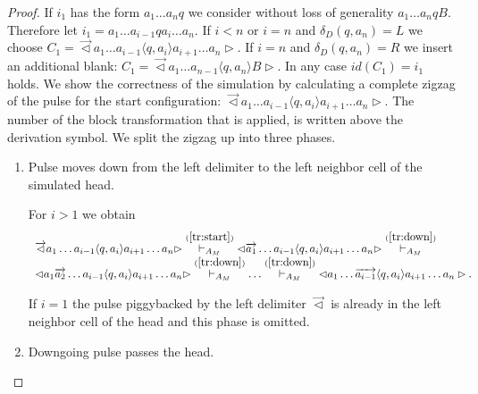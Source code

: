\documentclass[pre,amssymb,showpacs,showkeys,preprint]{revtex4}
\begin{document}
\begin{proof}
If $i_1$ has the form $a_1 \ldots a_n q$ we consider without loss of generality $a_1 \ldots a_n q B$.
Therefore let $i_1 = a_1 \ldots a_{i-1} q a_i \ldots a_n$.
If $i < n$ or $i = n$ and $\delta_D(q, a_n) = L$ we choose
 $C_1 = \overrightarrow{\lhd}  a_1 \ldots a_{i-1} \langle q,a_i \rangle a_{i+1} \ldots a_n \rhd$.
 If $i = n$ and $\delta_D(q, a_n) = R$ we insert an additional blank:
 $C_1 = \overrightarrow{\lhd}  a_1 \ldots a_{n-1} \langle q,a_n \rangle  B \rhd$.
 In any case $\mathit{id}(C_1)=i_1$ holds.
We show the correctness of the simulation by calculating a complete zigzag of the pulse for the
start configuration:
$\overrightarrow{\lhd}  a_1 \ldots a_{i-1} \langle q,a_i \rangle a_{i+1} \ldots a_n \rhd$.
The number of the block transformation that is applied, is written above the derivation symbol.
We split the zigzag up into three phases.

\begin{enumerate}
\item Pulse moves down from the left delimiter to the left neighbor cell of the simulated head.

For $i > 1$ we obtain
\begin{equation}
\begin{array}{l}
\overrightarrow{\lhd}  a_1 \ldots a_{i-1} \langle q,a_i \rangle a_{i+1} \ldots a_n \rhd
\stackrel{(\ref{tr:start})}{\vdash_{A_M}}
\lhd  \overrightarrow{a_1} \ldots a_{i-1} \langle q,a_i \rangle a_{i+1} \ldots a_n \rhd
\stackrel{(\ref{tr:down})}{\vdash_{A_M}} \\
\lhd  a_1 \overrightarrow{a_2} \ldots a_{i-1} \langle q,a_i \rangle a_{i+1} \ldots a_n \rhd
\stackrel{(\ref{tr:down})}{\vdash_{A_M}} \ldots \stackrel{(\ref{tr:down})}{\vdash_{A_M}}
\lhd  a_1 \ldots \overrightarrow{a_{i-1}} \langle q,a_i \rangle a_{i+1} \ldots a_n \rhd.
\label{der:start}
\end{array}
\end{equation}

If $i = 1$ the pulse piggybacked by the left delimiter $\overrightarrow{\lhd}$ is already
in the left neighbor cell of the head and this phase is omitted.

\item Downgoing pulse passes the head.


\end{enumerate}
\end{proof}
\end{document}
